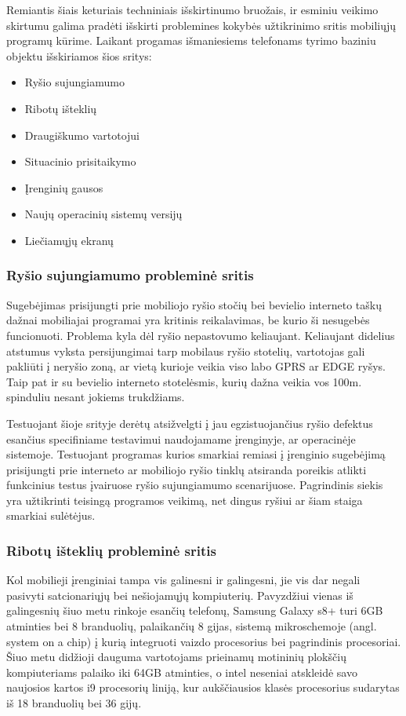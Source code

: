 \documentclass{VUMIFPSkursinis}
\begin{document}
Remiantis šiais keturiais techniniais išskirtinumo bruožais, ir esminiu veikimo skirtumu galima pradėti išskirti problemines kokybės užtikrinimo sritis mobiliųjų programų kūrime. Laikant progamas išmaniesiems telefonams tyrimo baziniu objektu išskiriamos šios sritys:
\begin{itemize}
  \item  Ryšio sujungiamumo
  \item Ribotų išteklių
  \item Draugiškumo vartotojui
  \item Situacinio prisitaikymo
  \item Įrenginių gausos
  \item Naujų operacinių sistemų versijų
  \item Liečiamųjų ekranų
\end{itemize}

\subsubsection{Ryšio sujungiamumo probleminė sritis}
Sugebėjimas prisijungti prie mobiliojo ryšio stočių bei bevielio interneto taškų dažnai mobiliajai programai yra kritinis reikalavimas, be kurio ši nesugebės funcionuoti. Problema kyla dėl ryšio nepastovumo keliaujant. Keliaujant didelius atstumus vyksta persijungimai tarp mobilaus ryšio stotelių, vartotojas gali pakliūti į neryšio zoną, ar vietą kurioje veikia viso labo GPRS ar EDGE ryšys. Taip pat ir su bevielio interneto stotelėsmis, kurių dažna veikia vos 100m. spinduliu nesant jokiems trukdžiams. 

Testuojant šioje srityje derėtų atsižvelgti į jau egzistuojančius ryšio defektus esančius specifiniame testavimui naudojamame įrenginyje, ar operacinėje sistemoje. \cite{android_bugs} Testuojant programas kurios smarkiai remiasi į įrenginio sugebėjimą prisijungti prie interneto ar mobiliojo ryšio tinklų atsiranda poreikis atlikti funkcinius testus įvairuose ryšio sujungiamumo scenarijuose. Pagrindinis siekis yra užtikrinti teisingą programos veikimą, net dingus ryšiui ar šiam staiga smarkiai sulėtėjus.

\subsubsection{Ribotų išteklių probleminė sritis}
Kol mobilieji įrenginiai tampa vis galinesni ir galingesni, jie vis dar negali pasivyti satcionariųjų bei nešiojamųjų kompiuterių. Pavyzdžiui vienas iš galingesnių šiuo metu rinkoje esančių telefonų, Samsung Galaxy s8+ turi 6GB atminties bei 8 branduolių, palaikančių 8 gijas, sistemą mikroschemoje (angl. system on a chip) į kurią integruoti vaizdo procesorius bei pagrindinis procesoriai. \cite{samsung_s8} Šiuo metu didžioji dauguma vartotojams prieinamų motininių plokščių kompiuteriams palaiko iki 64GB atminties, o intel neseniai atskleidė savo naujosios kartos i9 procesorių liniją, kur aukščiausios klasės procesorius sudarytas iš 18 branduolių bei 36 gijų. \cite{intel_i9}
\end{document}
